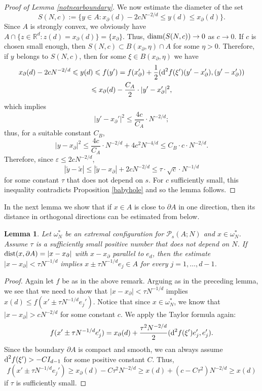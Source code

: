 \documentclass[12pt]{amsart}
\newtheorem{lemma}[theorem]{Lemma}
\theoremstyle{definition}
\def\R{\mathbb{R}}
\def\ep{\varepsilon}
\newcommand{\1}{\mathbf{1}}
\newcommand{\PP}{\mathcal{P}}
\begin{document}
\begin{proof}[Proof of Lemma \ref{notnearboundary}]
We now estimate the diameter of the set 
$$
S(N, c):=\{y\in A\colon x_\partial(d)-2cN^{-2/d}\leqslant y(d) \leqslant x_\partial(d)\}.
$$ 
Since $A$ is strongly convex, we obviously have $A\cap \{z\in \R^d\colon z(d)=x_\partial(d)\}=\{x_\partial\}$. Thus, $\textup{diam}(S(N,c))\to 0$ as $c\to 0$. If $c$ is chosen small enough, then $S(N, c) \subset B(x_\partial, \eta)\cap A$ for some $\eta>0$. 
Therefore, if $y$ belongs to $S(N, c)$, then for some $\xi\in B(x_\partial, \eta)$ we have
\begin{multline}
x_\partial(d)-2cN^{-2/d}\leqslant y(d)\leqslant f(y') = f(x_\partial') + \frac12 (\textup{d}^2 f(\xi')(y'-x_\partial'), (y'-x_\partial'))\\  \leqslant x_\partial(d)-\frac{C_A}{2}\cdot |y'-x_\partial'|^2,
\end{multline}
which implies
\begin{equation}
|y'-x_\partial '|^2\leqslant \frac{4c}{C_A}\cdot N^{-2/d};
\end{equation}
thus, for a suitable constant $C_B$,
$$
|y-x_\partial|^2\leqslant \frac{4c}{C_A}\cdot N^{-2/d}+4c^2 N^{-4/d}\leqslant C_B\cdot c\cdot N^{-2/d}.
$$
Therefore, since $\ep\leqslant 2cN^{-2/d}$,
$$
|\tilde{y}-\tilde{x}|\leqslant |\tilde{y}-x_\partial|+2cN^{-2/d} \leqslant \tau\cdot \sqrt{c}\cdot N^{-1/d} 
$$
for some constant $\tau$ that does not depend on $s$. For $c$ sufficiently small, this inequality contradicts Proposition \ref{babyhole} and so the lemma follows.
\end{proof}
In the next lemma we show that if $x\in A$ is close to $\partial A$ in one direction, then its distance in orthogonal directions can be estimated from below.
\begin{lemma}\label{vovsestoroni}
Let $\omega^*_N$ be an extremal configuration for $\PP_s(A; N)$ and $x\in \omega^*_N$. Assume $\tau$ is a sufficiently small positive number that does not depend on $N$. If $\textup{dist}(x, \partial A)=|x-x_\partial|$ with $x-x_\partial$ parallel to $e_d$, then the estimate $|x-x_\partial|< \tau N^{-1/d}$ implies $x\pm \tau N^{-1/d}e_j \in A$ for every $j=1, \ldots, d-1$.
\end{lemma}
\begin{proof}
Again let $f$ be as in the above remark. Arguing as in the preceding lemma, we see that we need to show that $|x-x_\partial|<\tau N^{-1/d}$ implies $x(d)\leqslant f(x'\pm\tau N^{-1/d}e_j')$. Notice that since $x\in \omega^*_N$, we know that $|x-x_\partial|>cN^{-2/d}$ for some constant $c$. We apply the Taylor formula again:
\begin{equation}
f(x'\pm\tau N^{-1/d}e_j')=x_\partial(d)+\frac{\tau^2 N^{-2/d}}2 (\textup{d}^2f(\xi') e'_j, e'_j).
\end{equation}
Since the boundary $\partial A$ is compact and smooth, we can always assume $\textup{d}^2f(\xi')>-CI_{d-1}$ for some positive constant $C$. Thus,
$$
f(x'\pm\tau N^{-1/d}e_j') \geqslant x_\partial(d)-C\tau^2 N^{-2/d} \geqslant x(d) + (c-C\tau^2)N^{-2/d}\geqslant x(d)
$$
if $\tau$ is sufficiently small. 
\end{proof}
\end{document}
